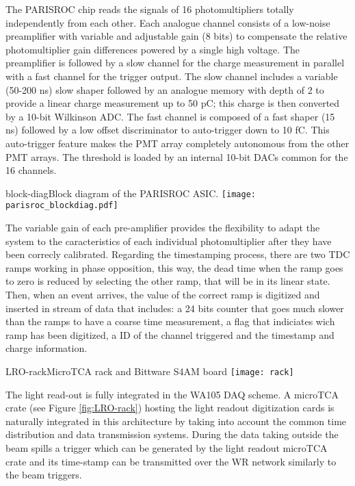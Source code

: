 The PARISROC chip reads the signals of 16 photomultipliers totally independently from each other. Each analogue channel consists of a low-noise preamplifier with variable and adjustable gain (8 bits) to compensate the relative photomultiplier gain differences powered by a single high voltage. The preamplifier is followed by a slow channel for the charge measurement in parallel with a fast channel for the trigger output. The slow channel includes a variable (50-200 ns) slow shaper followed by an analogue memory with depth of 2 to provide a linear charge measurement up to 50 pC; this charge is then converted by a 10-bit Wilkinson ADC. The fast channel is composed of a fast shaper (15 ns) followed by a low offset discriminator to auto-trigger down to 10 fC. This auto-trigger feature makes the PMT array completely autonomous from the other PMT arrays. The threshold is loaded by an internal 10-bit DACs common for the 16 channels.

\begin{cdrfigure}{block-diag}{Block diagram of the PARISROC ASIC.}
 \texttt{[image: parisroc\_blockdiag.pdf]}  
\end{cdrfigure}

The variable gain of each pre-amplifier provides the flexibility to adapt the system to the caracteristics of each individual photomultiplier after they have been correcly calibrated. Regarding the timestamping process, there are two TDC ramps working in phase opposition, this way, the dead time when the ramp goes to zero is reduced by selecting the other ramp, that will be in its linear state. Then, when an event arrives, the value of the correct ramp is digitized and inserted in stream of data that includes: a 24 bits counter that goes much slower than the ramps to have a coarse time measurement, a flag that indiciates wich ramp has been digitized, a ID of the channel triggered and the timestamp and charge information.

\begin{cdrfigure}{LRO-rack}{MicroTCA rack and Bittware S4AM board}
 \texttt{[image: rack]}  
\end{cdrfigure}

The light read-out is fully integrated in the WA105 DAQ scheme. A microTCA crate (see Figure \ref{fig:LRO-rack}) hosting the light readout digitization cards is naturally integrated in this architecture by taking into account the common time distribution and data transmission systems.  During the data taking outside the beam spills a trigger which can be generated by the light readout microTCA crate and its time-stamp can be transmitted over the WR network similarly to the beam triggers. 


